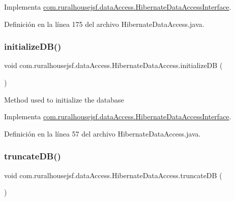 Implementa \mbox{\hyperlink{interfacecom_1_1ruralhousejsf_1_1data_access_1_1_hibernate_data_access_interface_a2cc9a4e0968b6fde1773f03f3d1ea33c}{com.\+ruralhousejsf.\+data\+Access.\+Hibernate\+Data\+Access\+Interface}}.



Definición en la línea 175 del archivo Hibernate\+Data\+Access.\+java.

\mbox{\label{classcom_1_1ruralhousejsf_1_1data_access_1_1_hibernate_data_access_af6f8016d5e185e86519871913781fe73}} 
\subsubsection{\texorpdfstring{initializeDB()}{initializeDB()}}
{\footnotesize\ttfamily void com.\+ruralhousejsf.\+data\+Access.\+Hibernate\+Data\+Access.\+initialize\+DB (\begin{DoxyParamCaption}{ }\end{DoxyParamCaption})}

Method used to initialize the database 

Implementa \mbox{\hyperlink{interfacecom_1_1ruralhousejsf_1_1data_access_1_1_hibernate_data_access_interface_acab426a4933f3510c317816c136cec0b}{com.\+ruralhousejsf.\+data\+Access.\+Hibernate\+Data\+Access\+Interface}}.



Definición en la línea 57 del archivo Hibernate\+Data\+Access.\+java.

\mbox{\label{classcom_1_1ruralhousejsf_1_1data_access_1_1_hibernate_data_access_a81a5e60db58acfc1a3c1de2f014813d5}} 
\subsubsection{\texorpdfstring{truncateDB()}{truncateDB()}}
{\footnotesize\ttfamily void com.\+ruralhousejsf.\+data\+Access.\+Hibernate\+Data\+Access.\+truncate\+DB (\begin{DoxyParamCaption}{ }\end{DoxyParamCaption})}

